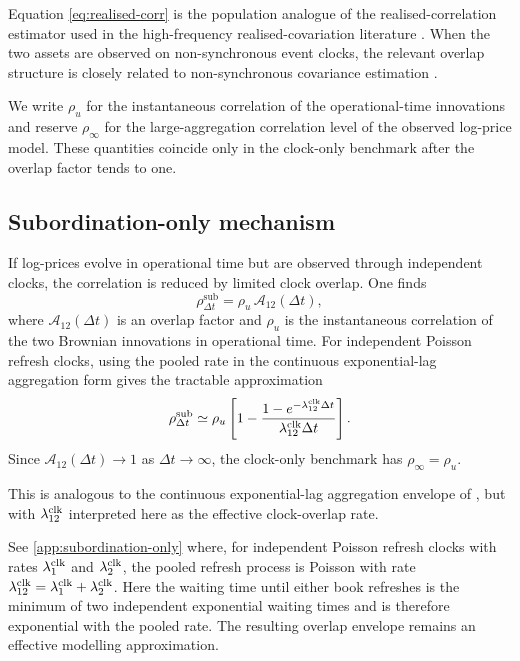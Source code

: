 \documentclass[5p,final]{elsarticle}
\begin{document}
Equation \eqref{eq:realised-corr} is the population analogue of the realised-correlation estimator used in the high-frequency realised-covariation literature \citep{BarndorffNielsenShephard2004RealizedCovariation}. When the two assets are observed on non-synchronous event clocks, the relevant overlap structure is closely related to non-synchronous covariance estimation \citep{hayashi2005}.

We write $\rho_u$ for the instantaneous correlation of the operational-time innovations and reserve $\rho_\infty$ for the large-aggregation correlation level of the observed log-price model. These quantities coincide only in the clock-only benchmark after the overlap factor tends to one.

\subsection{Subordination-only mechanism}

If log-prices evolve in operational time but are observed through independent clocks, the correlation is reduced
by limited clock overlap.
One finds
\begin{equation}
 \rho_{\Delta t}^{\mathrm{sub}}=\rho_u \, \mathcal{A}_{12}(\Delta t),
\end{equation}
where $\mathcal{A}_{12}(\Delta t)$ is an overlap factor and $\rho_u$ is the instantaneous correlation of the two Brownian innovations in operational time. For independent Poisson refresh clocks, using the pooled rate in the continuous exponential-lag aggregation form gives the tractable approximation
\begin{equation}
 \rho_{\Delta t}^{\mathrm{sub}}
 \simeq
 \rho_u \left[1-\frac{1-e^{-\lambda_{12}^{\rm clk}\Delta t}}{\lambda_{12}^{\rm clk}\Delta t}\right].
\end{equation}
Since $\mathcal A_{12}(\Delta t)\to1$ as $\Delta t\to\infty$, the clock-only benchmark has $\rho_\infty=\rho_u$.

This is analogous to the continuous exponential-lag aggregation envelope of \citet{toth2009}, but with $\lambda_{12}^{\rm clk}$ interpreted here as the effective clock-overlap rate.

See \ref{app:subordination-only} where, for independent Poisson refresh clocks with rates \(\lambda_1^{\rm clk}\) and \(\lambda_2^{\rm clk}\), the pooled refresh process is Poisson with rate $\lambda_{12}^{\rm clk}=\lambda_1^{\rm clk}+\lambda_2^{\rm clk}$.
Here the waiting time until either book refreshes is the minimum of two independent exponential waiting times and is therefore exponential with the pooled rate. The resulting overlap envelope remains an effective modelling approximation.
\end{document}
